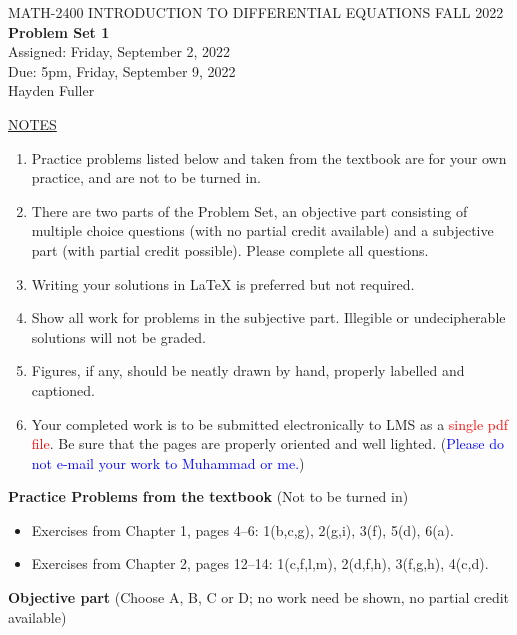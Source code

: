 \documentclass{article}
\begin{document}
\begin{center}
\large{ MATH-2400 \hspace{.27in}  INTRODUCTION TO DIFFERENTIAL EQUATIONS \hspace{.27in}FALL 2022\bigskip\\ {\bf Problem Set 1} \smallskip\\ Assigned: Friday, September 2, 2022 \\ Due: 5pm, Friday, September 9, 2022 \\ Hayden Fuller}
\end{center}

\bigskip\noindent
\underline{NOTES}
\begin{enumerate}
\item Practice problems listed below and taken from the textbook are for your own practice, and are not to be turned in.
\item There are two parts of the Problem Set, an objective part consisting of multiple choice questions (with no partial credit available) and a subjective part (with partial credit possible).  Please complete all questions.
\item Writing your solutions in {\LaTeX} is preferred but not required.
\item Show all work for problems in the subjective part.  Illegible or undecipherable solutions will not be graded. 
\item Figures, if any, should be neatly drawn by hand, properly labelled and captioned.  
\item Your completed work is to be submitted electronically to LMS  as a \textcolor{red}{single pdf file}. Be sure that the pages are properly oriented and well lighted.  (\textcolor{blue}{Please do not e-mail your work to Muhammad or me.})
\end{enumerate}


\bigskip\noindent
{\bf Practice Problems from the textbook} (Not to be turned in)
\begin{itemize}
\item
Exercises from Chapter 1, pages 4--6: 1(b,c,g), 2(g,i), 3(f), 5(d), 6(a).
\item
Exercises from Chapter 2, pages 12--14: 1(c,f,l,m), 2(d,f,h), 3(f,g,h), 4(c,d).
\end{itemize}

\bigskip\noindent
{\bf Objective part} (Choose A, B, C or D; no work need be shown, no partial credit available)
\end{document}
